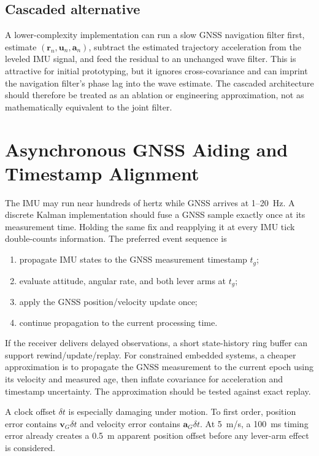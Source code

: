 \documentclass[conference]{IEEEtran}
\DeclareRobustCommand{\vct}[1]{\bm{#1}}
\begin{document}
\subsection{Cascaded alternative}

A lower-complexity implementation can run a slow GNSS navigation filter first,
estimate $(\vct r_n,\vct u_n,\vct a_n)$, subtract the estimated trajectory acceleration
from the leveled IMU signal, and feed the residual to an unchanged wave filter.  This
is attractive for initial prototyping, but it ignores cross-covariance and can imprint
the navigation filter's phase lag into the wave estimate.  The cascaded architecture
should therefore be treated as an ablation or engineering approximation, not as
mathematically equivalent to the joint filter.

\section{Asynchronous GNSS Aiding and Timestamp Alignment}
\label{sec:asynchronous}

The IMU may run near hundreds of hertz while GNSS arrives at 1--20~Hz.  A discrete
Kalman implementation should fuse a GNSS sample exactly once at its measurement time.
Holding the same fix and reapplying it at every IMU tick double-counts information.
The preferred event sequence is
\begin{enumerate}
  \item propagate IMU states to the GNSS measurement timestamp $t_g$;
  \item evaluate attitude, angular rate, and both lever arms at $t_g$;
  \item apply the GNSS position/velocity update once;
  \item continue propagation to the current processing time.
\end{enumerate}

If the receiver delivers delayed observations, a short state-history ring buffer can
support rewind/update/replay.  For constrained embedded systems, a cheaper
approximation is to propagate the GNSS measurement to the current epoch using its
velocity and measured age, then inflate covariance for acceleration and timestamp
uncertainty.  The approximation should be tested against exact replay.

A clock offset $\delta t$ is especially damaging under motion.  To first order,
position error contains $\vct v_G\delta t$ and velocity error contains
$\vct a_G\delta t$.  At \SI{5}{m/s}, a \SI{100}{ms} timing error already creates a
\SI{0.5}{m} apparent position offset before any lever-arm effect is considered.
\end{document}
